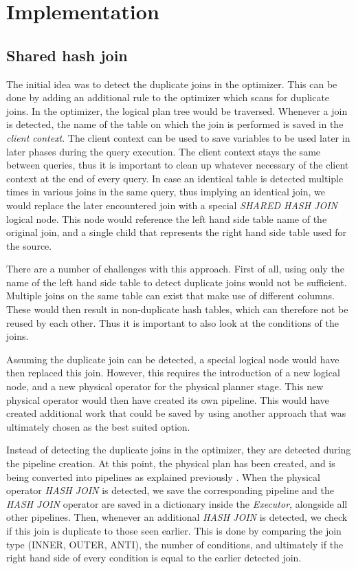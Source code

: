 \section{Implementation}

\subsection{Shared hash join}
The initial idea was to detect the duplicate joins in the optimizer. 
This can be done by adding an additional rule to the optimizer which scans for duplicate joins. 
In the optimizer, the logical plan tree would be traversed. 
Whenever a join is detected, the name of the table on which the join is performed is saved in the \textit{client context}. 
The client context can be used to save variables to be used later in later phases during the query execution. 
The client context stays the same between queries, thus it is important to clean up whatever necessary of the client context at the end of every query. 
In case an identical table is detected multiple times in various joins in the same query, thus implying an identical join, we would replace the later encountered join with a special \textit{SHARED HASH JOIN} logical node. 
This node would reference the left hand side table name of the original join, and a single child that represents the right hand side table used for the source. 

There are a number of challenges with this approach. 
First of all, using only the name of the left hand side table to detect duplicate joins would not be sufficient. 
Multiple joins on the same table can exist that make use of different columns. 
These would then result in non-duplicate hash tables, which can therefore not be reused by each other. Thus it is important to also look at the conditions of the joins. 

Assuming the duplicate join can be detected, a special logical node would have then replaced this join. However, this requires the introduction of a new logical node, and a new physical operator for the physical planner stage. This new physical operator would then have created its own pipeline. This would have created additional work that could be saved by using another approach that was ultimately chosen as the best suited option.

Instead of detecting the duplicate joins in the optimizer, they are detected during the pipeline creation. At this point, the physical plan has been created, and is being converted into pipelines as explained previously . 
When the physical operator \textit{HASH JOIN} is detected, we save the corresponding pipeline and the \textit{HASH JOIN} operator are saved in a dictionary inside the \textit{Executor}, alongside all other pipelines. Then, whenever an additional \textit{HASH JOIN} is detected, we check if this join is duplicate to those seen earlier. This is done by comparing the join type (INNER, OUTER, ANTI), the number of conditions, and ultimately if the right hand side of every condition is equal to the earlier detected join. 






